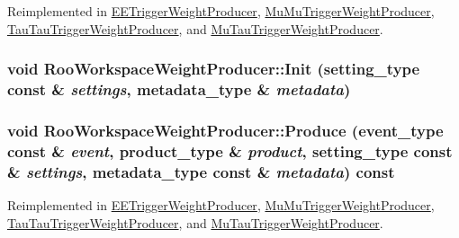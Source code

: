 Reimplemented in \hyperlink{classEETriggerWeightProducer_aa3ee349e72e7e9b3b64c582e5cc0d834}{EETriggerWeightProducer}, \hyperlink{classMuMuTriggerWeightProducer_aceeaf94e1e0b6fa4128b3f0b3ebec900}{MuMuTriggerWeightProducer}, \hyperlink{classTauTauTriggerWeightProducer_adac32370050277ab831ce6db2a957e8d}{TauTauTriggerWeightProducer}, and \hyperlink{classMuTauTriggerWeightProducer_ac7ed3993ecc2ad90b439b9aa9d478724}{MuTauTriggerWeightProducer}.\hypertarget{classRooWorkspaceWeightProducer_a9fcf58750dfbf0cfbca6b4a61e57f2c6}{
\subsubsection[{Init}]{\setlength{\rightskip}{0pt plus 5cm}void RooWorkspaceWeightProducer::Init (setting\_\-type const \& {\em settings}, \/  metadata\_\-type \& {\em metadata})}}
\label{classRooWorkspaceWeightProducer_a9fcf58750dfbf0cfbca6b4a61e57f2c6}
\hypertarget{classRooWorkspaceWeightProducer_afd139b8380a91e8aaa72066a8a826350}{
\subsubsection[{Produce}]{\setlength{\rightskip}{0pt plus 5cm}void RooWorkspaceWeightProducer::Produce (event\_\-type const \& {\em event}, \/  product\_\-type \& {\em product}, \/  setting\_\-type const \& {\em settings}, \/  metadata\_\-type const \& {\em metadata}) const}}
\label{classRooWorkspaceWeightProducer_afd139b8380a91e8aaa72066a8a826350}


Reimplemented in \hyperlink{classEETriggerWeightProducer_a1b3bd9104cf404304cecc13e4425dc07}{EETriggerWeightProducer}, \hyperlink{classMuMuTriggerWeightProducer_a0b8559ad9c392e68d1272ca49ad65a93}{MuMuTriggerWeightProducer}, \hyperlink{classTauTauTriggerWeightProducer_acea6bd34d07bef650fd48e5535ea0166}{TauTauTriggerWeightProducer}, and \hyperlink{classMuTauTriggerWeightProducer_a0401bf07b21eab934e0f9417b2316c5a}{MuTauTriggerWeightProducer}.

